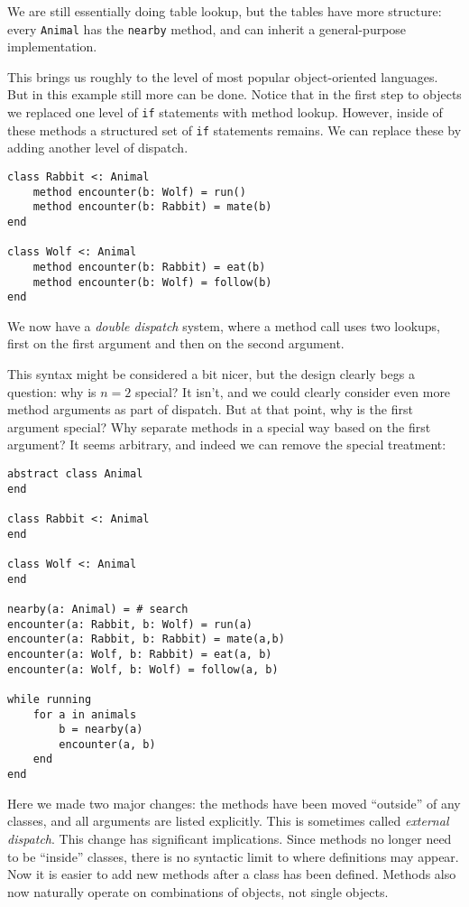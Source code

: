 We are still essentially doing table lookup, but the tables have
more structure: every \texttt{Animal} has the \texttt{nearby}
method, and can inherit a general-purpose implementation.

This brings us roughly to the level of most popular object-oriented
languages. But in this example still more can be done. Notice that
in the first step to objects we replaced one level of \texttt{if}
statements with method lookup. However, inside of these methods
a structured set of \texttt{if} statements remains. We can
replace these by adding another level of dispatch.

\begin{singlespace}
\begin{verbatim}
class Rabbit <: Animal
    method encounter(b: Wolf) = run()
    method encounter(b: Rabbit) = mate(b)
end

class Wolf <: Animal
    method encounter(b: Rabbit) = eat(b)
    method encounter(b: Wolf) = follow(b)
end
\end{verbatim}
\end{singlespace}

We now have a \emph{double dispatch} system, where a method call
uses two lookups, first on the first argument and then on the
second argument.

This syntax might be considered a bit nicer, but the design
clearly begs a question: why is $n=2$ special?
It isn't, and we could clearly consider even more method arguments as part of
dispatch.
But at that point, why is the first argument special?
Why separate methods in a special way based on the first argument?
It seems arbitrary, and indeed we can remove the special treatment:

\begin{singlespace}
\begin{verbatim}
abstract class Animal
end

class Rabbit <: Animal
end

class Wolf <: Animal
end

nearby(a: Animal) = # search
encounter(a: Rabbit, b: Wolf) = run(a)
encounter(a: Rabbit, b: Rabbit) = mate(a,b)
encounter(a: Wolf, b: Rabbit) = eat(a, b)
encounter(a: Wolf, b: Wolf) = follow(a, b)

while running
    for a in animals
        b = nearby(a)
        encounter(a, b)
    end
end
\end{verbatim}
\end{singlespace}

Here we made two major changes: the methods have been moved ``outside''
of any classes, and all arguments are listed explicitly.
This is sometimes called \emph{external dispatch}.
This change has significant implications.
Since methods no longer need to be ``inside'' classes, there is no syntactic
limit to where definitions may appear.
Now it is easier to add new methods after a class has been defined.
Methods also now naturally operate on combinations of objects, not single objects.

